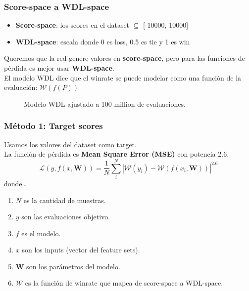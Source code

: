 \begin{frame}
\frametitle{Score-space a WDL-space}
\begin{itemize}
\item \textbf{Score-space}: los scores en el dataset $\subseteq$ [-10000, 10000]
\item \textbf{WDL-space}: escala donde 0 es loss, 0.5 es tie y 1 es win
\end{itemize}
\pause
Queremos que la red genere valores en \textbf{score-space}, pero para las funciones de pérdida es mejor usar \textbf{WDL-space}. \\
\pause
El modelo WDL dice que el winrate se puede modelar como una función de la evaluación: $\mathcal{W}(f(P))$ \pause \\
\begin{figure}[H]
\centering
{}
\caption{Modelo WDL ajustado a 100 million de evaluaciones.}
\end{figure}
\end{frame}

\begin{frame}
\frametitle{Método 1: Target scores}
Usamos los valores del dataset como target. \pause \\ La función de pérdida es \textbf{Mean Square Error (MSE)} con potencia 2.6.
\[
\mathcal{L}(y,f(x,\bm{W}))= \frac{1}{N} \sum_i^N \left| \mathcal{W}(y_i) - \mathcal{W}(f(x_i,\bm{W})) \right| ^{2.6}
\]
donde\dots

\begin{enumerate}
\itemsep0em
\item $N$ es la cantidad de muestras.
\item $y$ son las evaluaciones objetivo.
\item $f$ es el modelo.
\item $x$ son los inputs (vector del feature sets).
\item $\bm{W}$ son los parámetros del modelo.
\item $\mathcal{W}$ es la función de winrate que mapea de score-space a WDL-space.
\end{enumerate}
\end{frame}



